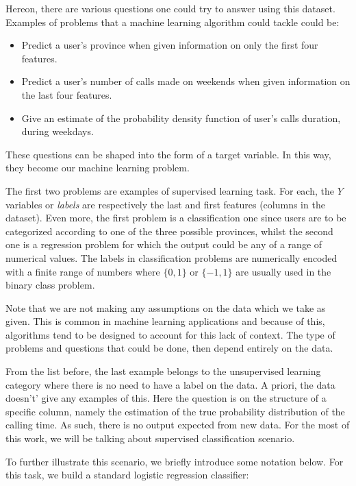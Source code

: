 Hereon, there are various questions one could try to answer using this dataset. Examples of problems that a machine learning algorithm could tackle could be:

\begin{itemize}
\item Predict a user's province when given information on only the first four features.
\item Predict a user's number of calls made on weekends when given information on the last four features.
\item Give an estimate of the probability density function of user's calls duration, during weekdays.
\end{itemize}

These questions can be shaped into the form of a target variable. In this way, they become our machine learning problem.

The first two problems are examples of supervised learning task. For each, the $Y$ variables or \textit{labels} are respectively the last and first features (columns in the dataset). Even more, the first problem is a classification one since users are to be categorized according to one of the three possible provinces, whilst the second one is a regression problem for which the output could be any of a range of numerical values. The labels in classification problems are numerically encoded with a finite range of numbers where $\{0,1\}$ or $\{-1,1\}$ are usually used in the binary class problem.

Note that we are not making any assumptions on the data which we take as given. %
This is common in machine learning applications and because of this, algorithms tend to be designed to account for this lack of context. The type of problems and questions that could be done, then depend entirely on the data.

From the list before, the last example belongs to the unsupervised learning category where there is no need to have a label on the data. A priori, the data doesn't' give any examples of this. Here the question is on the structure of a specific column, namely the estimation of the true probability distribution of the calling time. As such, there is no output expected from new data. For the most of this work, we will be talking about supervised classification scenario.

To further illustrate this scenario, we briefly introduce some notation below. For this task, we build a standard logistic regression classifier:

